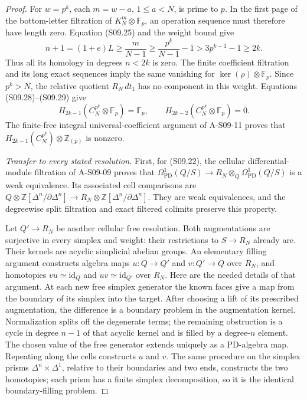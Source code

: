 \begin{proof}
For $w=p^k$, each $m=w-a$, $1\leq a<N$, is prime to
$p$.  In the first page of the bottom-letter filtration
of $K_N^m\otimes\mathbb F_p$, an operation sequence
must therefore have length zero.  Equation (S09.25) and
the weight bound give
\[
 n+1=(1+e)L\geq\frac{m}{N-1}
       \geq\frac{p^k}{N-1}-1
       >3p^{k-1}-1\geq2k.
\]
Thus all its homology in degrees $n<2k$ is zero.
The finite coefficient filtration and its long exact
sequences imply the same vanishing for
$\ker(\rho)\otimes\mathbb F_p$.  Since $p^k>N$, the
relative quotient $R_N\,dt_1$ has no component in this
weight.  Equations (S09.28)--(S09.29) give
\[
 H_{2k-1}(C_N^{p^k}\otimes\mathbb F_p)=\mathbb F_p,
 \qquad H_{2k-2}(C_N^{p^k}\otimes\mathbb F_p)=0.
 \tag{S09.30}
\]
The finite-free integral universal-coefficient argument
of A-S09-11 proves that
$H_{2k-1}(C_N^{p^k})\otimes\mathbb Z_{(p)}$ is nonzero.

\emph{Transfer to every stated resolution.}
First, for (S09.22), the cellular differential-module
filtration of A-S09-09 proves that
$\Omega^1_{\mathrm{PD}}(Q/S)\to
R_N\otimes_Q\Omega^1_{\mathrm{PD}}(Q/S)$ is a weak
equivalence.  Its associated cell comparisons are
$Q\otimes\mathbb Z[\Delta^n/\partial\Delta^n]\to
R_N\otimes\mathbb Z[\Delta^n/\partial\Delta^n]$.
They are weak equivalences, and the degreewise split
filtration and exact filtered colimits preserve this property.

Let $Q'\to R_N$ be another cellular free resolution.
Both augmentations are surjective in every simplex and
weight: their restrictions to $S\to R_N$ already are.
Their kernels are acyclic simplicial abelian groups.
An elementary filling argument constructs algebra maps
$u:Q\to Q'$ and $v:Q'\to Q$ over $R_N$, and homotopies
$vu\simeq\mathrm{id}_Q$ and $uv\simeq\mathrm{id}_{Q'}$
over $R_N$.  Here are the needed details of that argument.
At each new free simplex generator the known faces give
a map from the boundary of its simplex into the target.
After choosing a lift of its prescribed augmentation,
the difference is a boundary problem in the augmentation
kernel.  Normalization splits off the degenerate terms;
the remaining obstruction is a cycle in degree $n-1$
of that acyclic kernel and is filled by a degree-$n$
element.  The chosen value of the free generator extends
uniquely as a PD-algebra map.  Repeating along the cells
constructs $u$ and $v$.  The same procedure on the
simplex prisms $\Delta^n\times\Delta^1$, relative to
their boundaries and two ends, constructs the two
homotopies; each prism has a finite simplex decomposition,
so it is the identical boundary-filling problem.


\end{proof}
